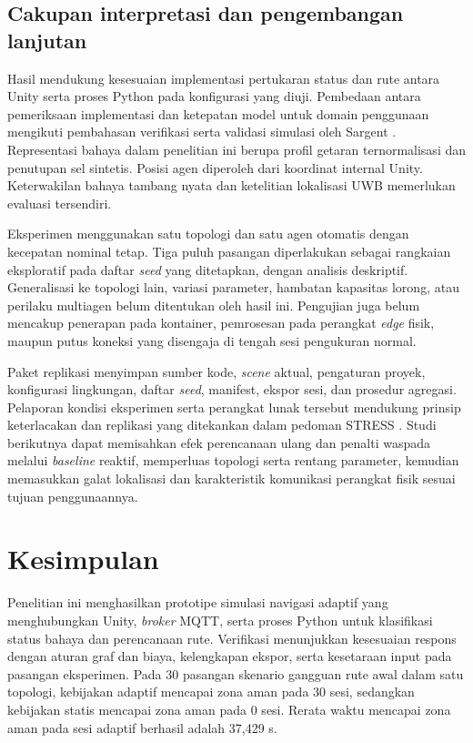 \documentclass[10pt,a4paper]{article}
\begin{document}
\subsection*{Cakupan interpretasi dan pengembangan lanjutan}
Hasil mendukung kesesuaian implementasi pertukaran status dan rute antara Unity serta proses Python pada konfigurasi yang diuji. Pembedaan antara pemeriksaan implementasi dan ketepatan model untuk domain penggunaan mengikuti pembahasan verifikasi serta validasi simulasi oleh Sargent \cite{fonseca}. Representasi bahaya dalam penelitian ini berupa profil getaran ternormalisasi dan penutupan sel sintetis. Posisi agen diperoleh dari koordinat internal Unity. Keterwakilan bahaya tambang nyata dan ketelitian lokalisasi UWB memerlukan evaluasi tersendiri.

Eksperimen menggunakan satu topologi dan satu agen otomatis dengan kecepatan nominal tetap. Tiga puluh pasangan diperlakukan sebagai rangkaian eksploratif pada daftar \emph{seed} yang ditetapkan, dengan analisis deskriptif. Generalisasi ke topologi lain, variasi parameter, hambatan kapasitas lorong, atau perilaku multiagen belum ditentukan oleh hasil ini. Pengujian juga belum mencakup penerapan pada kontainer, pemrosesan pada perangkat \emph{edge} fisik, maupun putus koneksi yang disengaja di tengah sesi pengukuran normal.

Paket replikasi menyimpan sumber kode, \emph{scene} aktual, pengaturan proyek, konfigurasi lingkungan, daftar \emph{seed}, manifest, ekspor sesi, dan prosedur agregasi. Pelaporan kondisi eksperimen serta perangkat lunak tersebut mendukung prinsip keterlacakan dan replikasi yang ditekankan dalam pedoman STRESS \cite{huang}. Studi berikutnya dapat memisahkan efek perencanaan ulang dan penalti waspada melalui \emph{baseline} reaktif, memperluas topologi serta rentang parameter, kemudian memasukkan galat lokalisasi dan karakteristik komunikasi perangkat fisik sesuai tujuan penggunaannya.

\FloatBarrier
\section*{Kesimpulan}
Penelitian ini menghasilkan prototipe simulasi navigasi adaptif yang menghubungkan Unity, \emph{broker} MQTT, serta proses Python untuk klasifikasi status bahaya dan perencanaan rute. Verifikasi menunjukkan kesesuaian respons dengan aturan graf dan biaya, kelengkapan ekspor, serta kesetaraan input pada pasangan eksperimen. Pada 30 pasangan skenario gangguan rute awal dalam satu topologi, kebijakan adaptif mencapai zona aman pada 30 sesi, sedangkan kebijakan statis mencapai zona aman pada 0 sesi. Rerata waktu mencapai zona aman pada sesi adaptif berhasil adalah 37,429 s.
\end{document}

